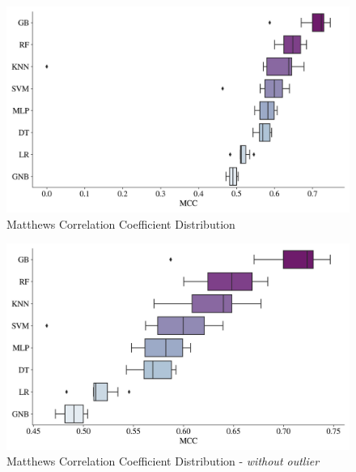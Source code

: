 \begin{figure}[H]
    \centering
    \caption{Matthews Correlation Coefficient Distribution}\vspace{0.5em}
    \label{fig:mccdist}
    \includegraphics[width=140mm]{Figures/MCC_Distribution.jpg}
    
    \vspace{-1em}
\end{figure}

\begin{figure}[H]
    \centering
    \caption{Matthews Correlation Coefficient Distribution - \textit{without outlier}}\vspace{0.5em}
    \label{fig:mccdistwoout}
    \includegraphics[width=140mm]{Figures/MCC_WO_OUTLIERS_Distribution.jpg}
    
    \vspace{-1em}
\end{figure}

